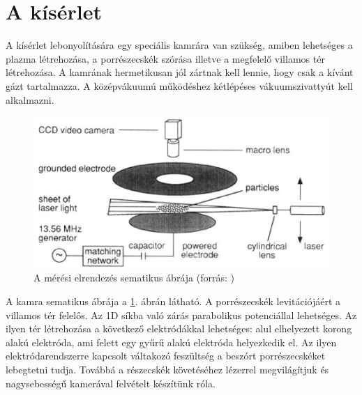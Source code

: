 \section{A kísérlet}
	A kísérlet lebonyolítására egy speciális kamrára van szükség, amiben lehetséges a plazma
	létrehozása, a porrészecskék szórása illetve a megfelelő villamos tér létrehozása.
	A kamrának hermetikusan jól zártnak kell lennie, hogy csak a kívánt gázt tartalmazza.
	A középvákuumú működéshez kétlépéses vákuumszivattyút kell alkalmazni.
	
	\begin{figure}[!h]
		\centering
		\includegraphics[width=0.9\columnwidth]{figures/eps/dust_camera.eps}
		\caption{A mérési elrendezés sematikus ábrája (forrás: \cite{Merlino2006})} 
		\label{fig:meresch} 
	\end{figure}
	
	A kamra sematikus ábrája a \ref{fig:meresch}. ábrán látható.
	A porrészecskék levitációjáért a villamos tér felelős. Az 1D síkba való zárás parabolikus
	potenciállal lehetséges. Az ilyen tér létrehozása a következő elektródákkal lehetséges: alul
	elhelyezett korong alakú elektróda, ami felett egy gyűrű alakú elektróda helyezkedik el.
	Az ilyen elektródarendszerre kapcsolt váltakozó feszültség a beszórt porrészecskéket lebegtetni
	tudja. Továbbá a részecskék követéséhez lézerrel megvilágítjuk és nagysebességű kamerával
	felvételt készítünk róla.
	
